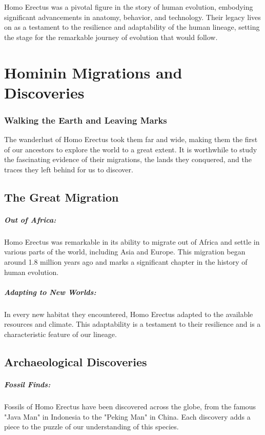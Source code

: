 \documentclass[a4paper,12pt]{book}
\begin{document}
Homo Erectus was a pivotal figure in the story of human evolution, embodying significant advancements in anatomy, behavior, and technology. Their legacy lives on as a testament to the resilience and adaptability of the human lineage, setting the stage for the remarkable journey of evolution that would follow.

\chapter{Hominin Migrations and Discoveries}
\subsection*{Walking the Earth and Leaving Marks}
The wanderlust of Homo Erectus took them far and wide, making them the first of our ancestors to explore the world to a great extent. It is worthwhile to study the fascinating evidence of their migrations, the lands they conquered, and the traces they left behind for us to discover.

\section*{The Great Migration}

\paragraph{Out of Africa:}
Homo Erectus was remarkable in its ability to migrate out of Africa and settle in various parts of the world, including Asia and Europe. This migration began around 1.8 million years ago and marks a significant chapter in the history of human evolution.

\paragraph{Adapting to New Worlds:}
In every new habitat they encountered, Homo Erectus adapted to the available resources and climate. This adaptability is a testament to their resilience and is a characteristic feature of our lineage.

\section*{Archaeological Discoveries}

\paragraph{Fossil Finds:}
Fossils of Homo Erectus have been discovered across the globe, from the famous "Java Man" in Indonesia to the "Peking Man" in China. Each discovery adds a piece to the puzzle of our understanding of this species.
\end{document}
